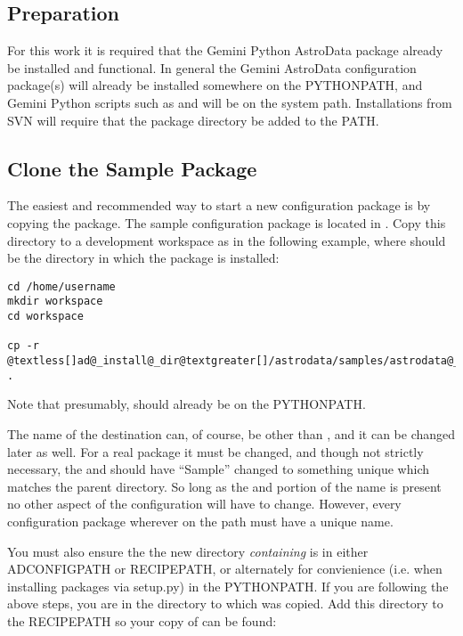 \documentclass[letterpaper,10pt,english]{sphinxmanual}
\begin{document}
\subsection{Preparation}
\label{startingTheConfig:preparation}
For this work it is required that the Gemini Python AstroData package already
be installed and
functional. In general the Gemini AstroData configuration package(s) will
already
be installed somewhere on the PYTHONPATH, and Gemini Python scripts such
as  and
 will be on the system path.  Installations from SVN will
require that the  package directory be added to the PATH.


\subsection{Clone the Sample Package}
\label{startingTheConfig:clone-the-sample-package}
The easiest and recommended way to start a new configuration package is by copying the
 package. The sample configuration package is located in
. Copy this directory to a development workspace
as in the following example, where  should be the directory in
which the  package is installed:

\begin{Verbatim}[commandchars=@\[\]]
cd /home/username
mkdir workspace
cd workspace

cp -r @textless[]ad@_install@_dir@textgreater[]/astrodata/samples/astrodata@_Sample .
\end{Verbatim}

Note that presumably,  should already be on the PYTHONPATH.

The name of the destination can, of course, be other than ,
and it can be changed later as well. For a real package it must be changed, and
though not strictly necessary, the  and  should
have ``Sample'' changed to something unique which matches the parent
 directory. So long as the  and 
portion of the name is present no other aspect of the configuration will have to
change. However, every configuration package wherever on the
path must have a unique name.

You must also ensure the the new directory \emph{containing}
 is in either ADCONFIGPATH or RECIPEPATH, or alternately
for convienience (i.e. when installing packages via setup.py) in the PYTHONPATH.
If you are following the above steps, you are in the directory to which
 was copied. Add this directory to the RECIPEPATH so your copy
of  can be found:
\end{document}
